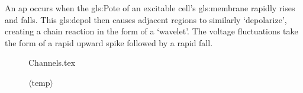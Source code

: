 \documentclass[class={myRUCProject}, crop=false]{standalone}
\begin{document}
An \gls{ap} occurs when the \gls{gls:Pote} of an excitable cell's \gls{gls:membrane} rapidly rises and falls. This \gls{gls:depol} then causes adjacent regions to similarly `depolarize', creating a chain reaction in the form of a `wavelet'.
The voltage fluctuations take the form of a rapid upward spike followed by a rapid fall.


\begin{figure}[H]
  \centering
  {Channels.tex}
  \caption{ $\langle \text{temp} \rangle$ }\label{fig:Channels}
\end{figure}

\end{document}
